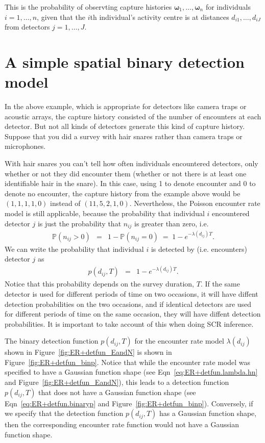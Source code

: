 \documentclass[graybox,envcountchap,sectrefs]{SpringerStyleFiles/styles/svmono}\usepackage[]{graphicx}\usepackage[]{color}
\newcommand{\be}{\begin{eqnarray}}
\newcommand{\ee}{\end{eqnarray}}
\begin{document}
This is the probability of observting capture histories $\bm{\omega}_1,\ldots,\bm{\omega}_n$ for individuals $i=1,\ldots,n$, given that the $i$th individual's activity centre is at distances $d_{i1},\ldots,d_{iJ}$ from detectors $j=1,\ldots,J$. 

\section{A simple spatial binary detection model}
\label{sec:ER+detfun.simple.det.model}

In the above example, which is appropriate for detectors like camera traps or acoustic arrays, the capture history consisted of the number of encounters at each detector. But not all kinds of detectors generate this kind of capture history. Suppose that you did a survey with hair snares rather than camera traps or microphones.

With hair snares you can't tell how often individuals encountered detectors, only whether or not they did encounter them (whether or not there is at least one identifiable hair in the snare). In this case, using 1 to denote encounter and 0 to denote no encounter, the capture history from the example above would be $(1,1,1,1,0)$ instead of $(11,5,2,1,0)$. Nevertheless, the Poisson encounter rate model is still applicable, because the probability that individual $i$ encountered detector $j$ is just the probability that $n_{ij}$ is greater than zero, i.e.
\be
\mathbb{P}(n_{ij}>0)&=&1-\mathbb{P}(n_{ij}=0)
\;=\;1-e^{-\lambda(d_{ij})T}. 
\ee
We can write the probability that individual $i$ is detected by (i.e. encounters) detector $j$ as 
\be
p(d_{ij},T)&=&1-e^{-\lambda(d_{ij})T}. 
\label{eq:ER+detfun.binaryp}
\ee
Notice that this probability depends on the survey duration, $T$. If the same detector is used for different periods of time on two occasions, it will have diffent detection probabilities on the two occasions, and if identical detectors are used for different periods of time on the same occasion, they will have diffent detection probabilities. It is important to take account of this when doing SCR inference.

The binary detection function $p(d_{ij},T)$ for the encounter rate model $\lambda(d_{ij})$ shown in Figure~\ref{fig:ER+detfun_EandN} is shown in Figure~\ref{fig:ER+detfun_binp}. Notice that while the encounter rate model was specified to have a Gaussian function shape (see Eqn~\eqref{eq:ER+detfun.lambda.hn} and Figure~\ref{fig:ER+detfun_EandN}), this leads to a detection function $p(d_{ij},T)$ that does not have a Gaussian function shape (see Eqn~\eqref{eq:ER+detfun.binaryp} and Figure~\ref{fig:ER+detfun_binp}). Conversely, if we specify that the detection function $p(d_{ij},T)$ has a Gaussian function shape, then the corresponding encounter rate function would not have a Gaussian function shape.
\end{document}
